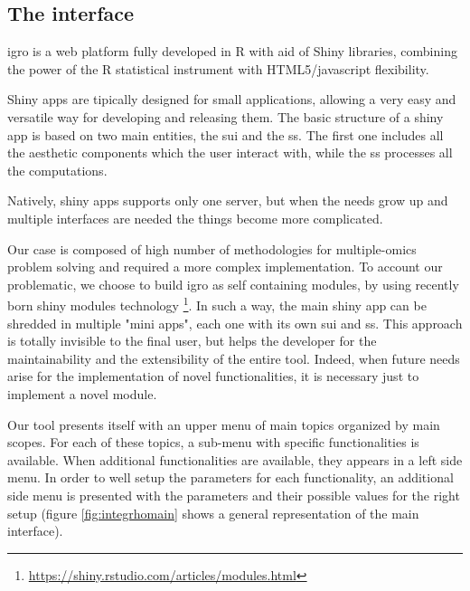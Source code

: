 \subsection{The interface}
\gls{igro} is a web platform fully developed in R with aid of Shiny libraries, combining the power of the R statistical instrument with HTML5/javascript flexibility.

Shiny apps are tipically designed for small applications, allowing a very easy and versatile way for developing and releasing them.
The basic structure of a shiny app is based on two main entities, the \gls{sui} and the \gls{ss}.
The first one includes all the aesthetic components which the user interact with, while the \gls{ss} processes all the computations.

Natively, shiny apps supports only one server, but when the needs grow up and multiple interfaces are needed the things become more complicated. 

Our case is composed of high number of methodologies for multiple-omics problem solving and required a more complex implementation.
To account our problematic, we choose to build \gls{igro} as self containing modules, by using recently born shiny modules technology \footnote{\url{https://shiny.rstudio.com/articles/modules.html}}.
In such a way, the main shiny app can be shredded in multiple "mini apps", each one with its own \gls{sui} and \gls{ss}.
This approach is totally invisible to the final user, but helps the developer for the maintainability and the extensibility of the entire tool.
Indeed, when future needs arise for the implementation of novel functionalities, it is necessary just to implement a novel module.

Our tool presents itself with an upper menu of main topics organized by main scopes. 
For each of these topics, a sub-menu with specific functionalities is available.
When additional functionalities are available, they appears in a left side menu.
In order to well setup the parameters for each functionality, an additional side menu is presented with the parameters and their possible values for the right setup (figure \ref{fig:integrhomain} shows a general representation of the main interface).

